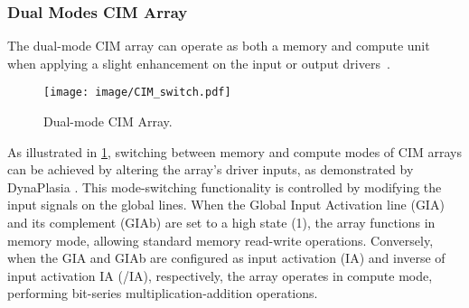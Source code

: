 \subsubsection{Dual Modes CIM Array}

The dual-mode CIM array can operate as both a memory and compute unit when applying a slight enhancement on the input or output drivers~\cite{kim202316,yan20221,yue202115,chih202116,fujiwara20225,wang2022dimc,spetalnick202240nm,ankit2020panther}.

\begin{figure}[t]
    \centering
    \texttt{[image: image/CIM\_switch.pdf]}
    \caption{Dual-mode CIM Array.}
    \label{fig:cim_switch}
\end{figure}
As illustrated in \fig \ref{fig:cim_switch}, switching between memory and compute modes of CIM arrays can be achieved by altering the array's driver inputs, as demonstrated by DynaPlasia \cite{kim202316}.
This mode-switching functionality is controlled by modifying the input signals on the global lines.
When the Global Input Activation line (GIA) and its complement (GIAb) are set to a high state (1), the array functions in memory mode, allowing standard memory read-write operations. 
Conversely, when the GIA and GIAb are configured as input activation (IA) and inverse of input activation IA (/IA), respectively, the array operates in compute mode, performing bit-series multiplication-addition operations.  

